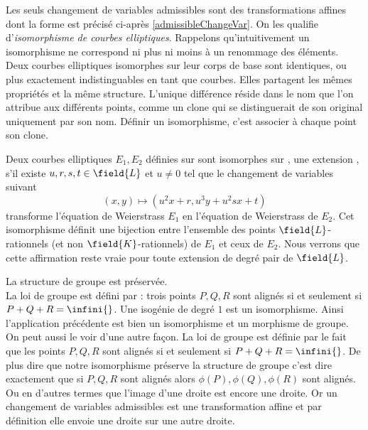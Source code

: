 
Les seuls changement de variables admissibles sont des transformations affines dont la forme est précisé ci-après \eqref{admissibleChangeVar}. On les qualifie d'\emph{isomorphisme de courbes elliptiques}. Rappelons qu'intuitivement un isomorphisme ne correspond ni plus ni moins à un renommage des éléments. Deux courbes elliptiques isomorphes sur leur corps de base sont identiques, ou plus exactement indistinguables en tant que courbes. Elles partagent les mêmes propriétés et la même structure. L'unique différence réside dans le nom que l'on attribue aux différents points, comme un clone qui se distinguerait de son original uniquement par son nom. Définir un isomorphisme, c'est associer à chaque point son clone. 

\begin{definition}
Deux courbes elliptiques $E_1, E_2$ définies sur \field{} sont isomorphes sur , une extension \field{}, s'il existe $u, r, s, t \in \field{L}$ et $u \ne 0$ tel que le changement de variables suivant
\begin{equation*}
    (x, y) \mapsto (u^2x + r, u^3y + u^2sx + t)
    \label{admissibleChangeVar}
\end{equation*}
transforme l'équation de Weierstrass $E_1$ en l'équation de Weierstrass de $E_2$. Cet isomorphisme définit une bijection entre l'ensemble des points $\field{L}$-rationnels (et non $\field{K}$-rationnels) de $E_1$ et ceux de $E_2$. Nous verrons que cette affirmation reste vraie pour toute extension de degré pair de $\field{L}$.
\end{definition}

La structure de groupe est préservée.\\
La loi de groupe est défini par : trois points $P, Q, R$ sont alignés si et seulement si $P + Q + R = \infini{}$. 
Une isogénie de degré $1$ est un isomorphisme. Ainsi l'application précédente est bien un isomorphisme et un morphisme de groupe. On peut aussi le voir d'une autre façon. La loi de groupe est définie par le fait que les points $P, Q, R$ sont alignés si et seulement si $P + Q + R = \infini{}$. De plus dire que notre isomorphisme préserve la structure de groupe c'est dire exactement que si $P, Q, R$ sont alignés alors $\phi(P), \phi(Q), \phi(R)$ sont alignés. Ou en d'autres termes que l'image d'une droite est encore une droite. Or un changement de variables admissibles est une transformation affine et par définition elle envoie une droite sur une autre droite.

